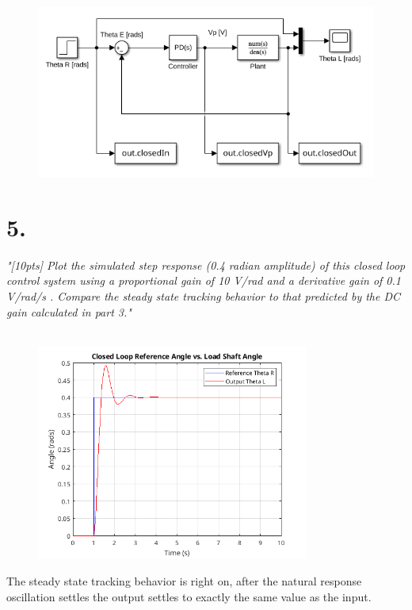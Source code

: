 \documentclass{article}
\begin{document}
\begin{figure}[H]
    \centering
    \includegraphics[width=\textwidth]{closedModel.png}
\end{figure}

\section*{5.}

\textit{
    "[10pts] Plot the simulated step response (0.4 radian amplitude) of this closed loop control
    system using a proportional gain of 10 V/rad and a derivative gain of 0.1 V/rad/s . Compare the
    steady state tracking behavior to that predicted by the DC gain calculated in part 3."
}
\\
\\
\begin{figure}[H]
    \centering
    \includegraphics[width=0.8\textwidth]{closedLoopStepPlot.png}
\end{figure}

The steady state tracking behavior is right on, after the natural response oscillation settles the output settles to exactly the same value as the input.
\end{document}
